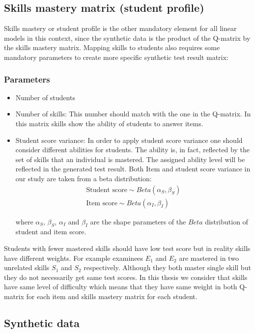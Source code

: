 \subsection{Skills mastery matrix (student profile)}
\label{Student_Profile}
Skills mastery or student profile is the other mandatory element for all linear models in this context, since the synthetic data is the product of the Q-matrix by the skills mastery matrix. Mapping skills to students also requires some mandatory parameters to create more specific synthetic test result matrix:
\subsubsection{Parameters}
\begin{itemize}
\item Number of students 
\item Number of skills: This number should match with the one in the Q-matrix. In this matrix skills show the ability of students to answer items.
\item Student score variance: In order to apply student score variance one should consider different abilities for students. The ability is, in fact, reflected by the set of skills that an individual is mastered. The assigned ability level will be reflected in the generated test result. Both Item and student score variance in our study are taken from a beta distribution:
\begin{eqnarray*}
\textrm{Student score} \sim Beta(\alpha_S, \beta_S)\\
\textrm{Item score} \sim Beta(\alpha_I, \beta_I)
\end{eqnarray*}

where $\alpha_S$, $\beta_S$, $\alpha_I$ and  $\beta_I$ are the shape parameters of the $Beta$ distribution of student and item score.

\end{itemize}

Students with fewer mastered skills should have low test score but in reality skills have different weights. For example examinees $E_1$ and $E_2$ are mastered in two unrelated skills $S_1$ and $S_2$ respectively. Although they both master single skill but they do not necessarily get same test scores. In this thesis we consider that skills have same level of difficulty which means that they have same weight in both Q-matrix for each item and skills mastery matrix for each student. 


\subsection{Synthetic data}

